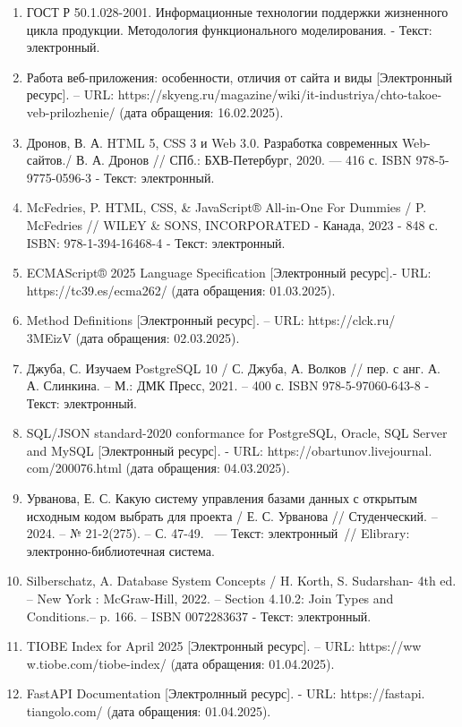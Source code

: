 \documentclass[a4paper,14pt,oneside]{extreport}
\begin{document}
\begin{enumerate}
    \item ГОСТ Р 50.1.028-2001. Информационные технологии поддержки жизненного цикла продукции. Методология функционального моделирования. - Текст: электронный.
    \item Работа веб-приложения: особенности, отличия от сайта и виды [Электронный ресурс]. – URL: https://skyeng.ru/magazine/wiki/it-industriya/chto-takoe-veb-prilozhenie/ (дата обращения: 16.02.2025).
    \item Дронов, В. А. HTML 5, CSS 3 и Web 3.0. Разработка современных Web-сайтов./ В. А. Дронов // СПб.: БХВ-Петербург, 2020. — 416 с. ISBN 978-5-9775-0596-3 - Текст: электронный.
    \item McFedries, P. HTML, CSS, \& JavaScript® All-in-One For Dummies / P. McFedries // WILEY \& SONS, INCORPORATED - Канада, 2023 - 848 с. ISBN: 978-1-394-16468-4 - Текст: электронный.
    \item  ECMAScript® 2025 Language Specification [Электронный ресурс].- URL: https://tc39.es/ecma262/ (дата обращения: 01.03.2025).
    \item Method Definitions [Электронный ресурс]. – URL: https://clck.ru/\\3MEizV (дата обращения: 02.03.2025).
    \item Джуба, С. Изучаем PostgreSQL 10 / С. Джуба, А. Волков // пер. с анг. А. А. Слинкина. – М.: ДМК Пресс, 2021. – 400 с. ISBN 978-5-97060-643-8 - Текст: электронный.
    \item  SQL/JSON standard-2020 conformance for PostgreSQL, Oracle, SQL Server and MySQL [Электронный ресурс]. - URL: https://obartunov.livejournal.\\com/200076.html (дата обращения: 04.03.2025).
    \item  Урванова, Е. С. Какую систему управления базами данных с открытым исходным кодом выбрать для проекта / Е. С. Урванова // Студенческий. – 2024. – № 21-2(275). – С. 47-49.  — Текст: электронный // Elibrary: электронно-библиотечная система.
    \item Silberschatz, A. Database System Concepts / H. Korth, S. Sudarshan- 4th ed. – New York : McGraw-Hill, 2022. – Section 4.10.2: Join Types and Conditions.– p. 166. – ISBN 0072283637 - Текст: электронный.
    \item TIOBE Index for April 2025 [Электронный ресурс]. – URL: https://ww\\w.tiobe.com/tiobe-index/ (дата обращения: 01.04.2025).
    \item FastAPI Documentation [Электролнный ресурс]. - URL: https://fastapi.\\tiangolo.com/ (дата обращения: 01.04.2025).

\end{enumerate}
\end{document}
